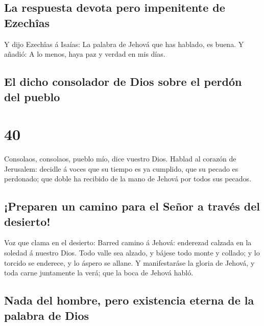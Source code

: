 \hypertarget{la-respuesta-devota-pero-impenitente-de-ezechuxeeas}{%
\subsection{La respuesta devota pero impenitente de
Ezechîas}\label{la-respuesta-devota-pero-impenitente-de-ezechuxeeas}}

 Y dijo Ezechîas á Isaías: La palabra de Jehová que has
hablado, es buena. Y añadió: A lo menos, haya paz y verdad en mis días.

\hypertarget{el-dicho-consolador-de-dios-sobre-el-perduxf3n-del-pueblo}{%
\subsection{El dicho consolador de Dios sobre el perdón del
pueblo}\label{el-dicho-consolador-de-dios-sobre-el-perduxf3n-del-pueblo}}

\hypertarget{section-39}{%
\section{40}\label{section-39}}

 Consolaos, consolaos, pueblo mío, dice vuestro Dios.
 Hablad al corazón de Jerusalem: decidle á voces que su
tiempo es ya cumplido, que su pecado es perdonado; que doble ha recibido
de la mano de Jehová por todos sus pecados.

\hypertarget{preparen-un-camino-para-el-seuxf1or-a-travuxe9s-del-desierto}{%
\subsection{¡Preparen un camino para el Señor a través del
desierto!}\label{preparen-un-camino-para-el-seuxf1or-a-travuxe9s-del-desierto}}

 Voz que clama en el desierto: Barred camino á Jehová:
enderezad calzada en la soledad á nuestro Dios.  Todo
valle sea alzado, y bájese todo monte y collado; y lo torcido se
enderece, y lo áspero se allane.  Y manifestaráse la
gloria de Jehová, y toda carne juntamente la verá; que la boca de Jehová
habló.

\hypertarget{nada-del-hombre-pero-existencia-eterna-de-la-palabra-de-dios}{%
\subsection{Nada del hombre, pero existencia eterna de la palabra de
Dios}\label{nada-del-hombre-pero-existencia-eterna-de-la-palabra-de-dios}}

